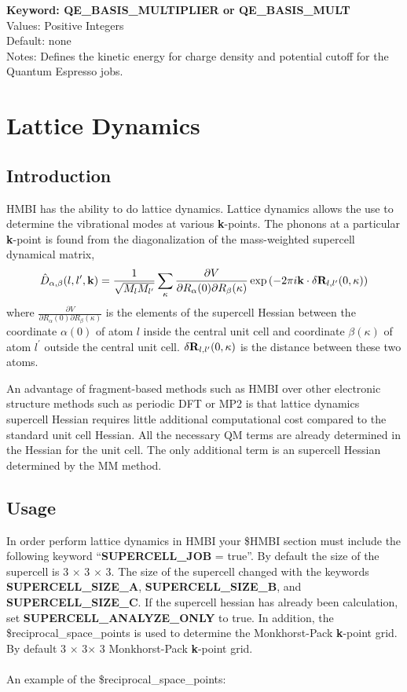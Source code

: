 \documentclass[11pt,letterpaper]{article}
\begin{document}
\begin{spacing}{1.0}
\noindent
\textbf{Keyword: QE\_BASIS\_MULTIPLIER or QE\_BASIS\_MULT}\\
Values: Positive Integers\\
Default: none\\
Notes: Defines the kinetic energy for charge density and potential cutoff for the Quantum Espresso jobs.\\

\section{Lattice Dynamics}
\label{Chap-Lat-Dyn}
\subsection{Introduction}

HMBI has the ability to do lattice dynamics. Lattice
dynamics allows the use to determine the vibrational modes at 
various {\bf k}-points. The phonons at a particular {\bf k}-point
is found from the diagonalization of the mass-weighted
supercell dynamical matrix,
\begin{equation}
\label{eq-dyn-mat}
\hat{D}_{\alpha,\beta}(l,l^\prime,{\bf k} ) = \frac{1}{\sqrt{M_l M_{l^\prime}}}\sum_{\kappa}\frac{\partial V}{\partial R_\alpha(0)\partial R_\beta(\kappa)} \exp{\left(-2\pi i {\bf k} \cdot \delta {\bf R}_{l,l^{\prime}}(0,\kappa) \right)}
\end{equation}
where $\frac{\partial V}{\partial R_\alpha(0)\partial R_\beta(\kappa)}$  is the elements of the supercell Hessian between the coordinate $\alpha(0)$  of atom $l$ 
inside the central unit cell and coordinate $\beta(\kappa)$ of atom $l^\prime$ outside the central unit cell. ${ \delta \bf R}_{l,l^{\prime}}(0,\kappa)$ is the distance
between these two atoms.

 An advantage of fragment-based methods 
such as HMBI over other electronic structure methods such as periodic DFT or MP2 is that lattice dynamics supercell Hessian requires little additional computational 
cost compared to the standard unit cell Hessian. All the necessary QM terms are already determined in the Hessian for the unit cell. The only additional term is an
supercell Hessian determined by the MM method.

\subsection{Usage}


In order perform lattice dynamics in HMBI your \$HMBI section must include the following keyword
 ``{\bf SUPERCELL\_JOB}  = true''. By default the size of the supercell is 3 
$\times$ 3 $\times$ 3. The size of the supercell
changed with the keywords {\bf SUPERCELL\_SIZE\_A}, {\bf SUPERCELL\_SIZE\_B}, and {\bf SUPERCELL\_SIZE\_C}.
If the supercell hessian has already been calculation, set {\bf SUPERCELL\_ANALYZE\_ONLY} to true.
In addition, the \$reciprocal\_space\_points is used to determine the Monkhorst-Pack {\bf k}-point grid.
By default  3 $\times$ 3$ \times$ 3 Monkhorst-Pack {\bf k}-point grid. \\
\\
\noindent
An example of the \$reciprocal\_space\_points:


\end{spacing}
\end{document}
